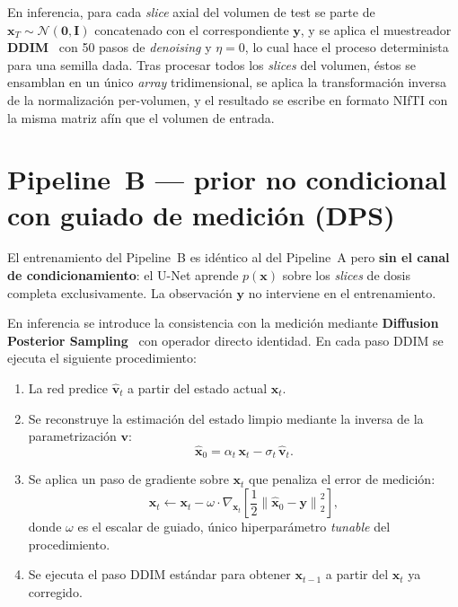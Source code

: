 En inferencia, para cada \textit{slice} axial del volumen de test
se parte de $\mathbf{x}_T \sim \mathcal{N}(\mathbf{0}, \mathbf{I})$
concatenado con el correspondiente $\mathbf{y}$, y se aplica el
muestreador \textbf{DDIM}~\cite{song2021ddim} con 50 pasos de
\textit{denoising} y $\eta = 0$, lo cual hace el proceso
determinista para una semilla dada. Tras procesar todos los
\textit{slices} del volumen, éstos se ensamblan en un único
\textit{array} tridimensional, se aplica la transformación
inversa de la normalización per-volumen, y el resultado se
escribe en formato NIfTI con la misma matriz afín que el volumen
de entrada.

\section{Pipeline~B — prior no condicional con guiado de medición
(DPS)}
\label{sec:pet-pipeline-b}

El entrenamiento del Pipeline~B es idéntico al del Pipeline~A
pero \textbf{sin el canal de condicionamiento}: el U-Net aprende
$p(\mathbf{x})$ sobre los \textit{slices} de dosis completa
exclusivamente. La observación $\mathbf{y}$ no interviene en el
entrenamiento.

En inferencia se introduce la consistencia con la medición
mediante \textbf{Diffusion Posterior Sampling}~\cite{chung2023dps}
con operador directo identidad. En cada paso DDIM se ejecuta el
siguiente procedimiento:

\begin{enumerate}[leftmargin=*]
    \item La red predice $\hat{\mathbf{v}}_t$ a partir del estado
    actual $\mathbf{x}_t$.
    \item Se reconstruye la estimación del estado limpio
    mediante la inversa de la parametrización $\mathbf{v}$:
    \begin{equation}
        \hat{\mathbf{x}}_0
        = \alpha_t\,\mathbf{x}_t
        - \sigma_t\,\hat{\mathbf{v}}_t.
    \end{equation}
    \item Se aplica un paso de gradiente sobre $\mathbf{x}_t$ que
    penaliza el error de medición:
    \begin{equation}
        \mathbf{x}_t \leftarrow
            \mathbf{x}_t - \omega \cdot
            \nabla_{\mathbf{x}_t}
            \!\left[\frac{1}{2}
                \left\|\hat{\mathbf{x}}_0 - \mathbf{y}\right\|_2^2
            \right],
    \end{equation}
    donde $\omega$ es el escalar de guiado, único hiperparámetro
    \textit{tunable} del procedimiento.
    \item Se ejecuta el paso DDIM estándar para obtener
    $\mathbf{x}_{t-1}$ a partir del $\mathbf{x}_t$ ya corregido.
\end{enumerate}

